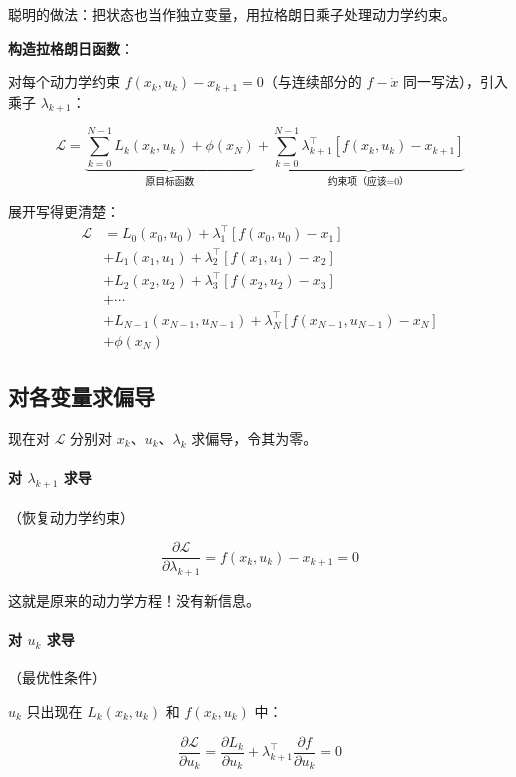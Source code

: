 聪明的做法：把状态也当作独立变量，用拉格朗日乘子处理动力学约束。

\textbf{构造拉格朗日函数}：

对每个动力学约束 $f(x_k, u_k) - x_{k+1} = 0$（与连续部分的 $f - \dot{x}$ 同一写法），引入乘子 $\lambda_{k+1}$：

\begin{equation}
\mathcal{L} = \underbrace{\sum_{k=0}^{N-1} L_k(x_k, u_k) + \phi(x_N)}_{\text{原目标函数}} + \underbrace{\sum_{k=0}^{N-1} \lambda_{k+1}^\top \left[ f(x_k, u_k) - x_{k+1} \right]}_{\text{约束项（应该=0）}}
\end{equation}

展开写得更清楚：
\begin{align}
\mathcal{L} &= L_0(x_0, u_0) + \lambda_1^\top [f(x_0, u_0) - x_1] \\
&+ L_1(x_1, u_1) + \lambda_2^\top [f(x_1, u_1) - x_2] \\
&+ L_2(x_2, u_2) + \lambda_3^\top [f(x_2, u_2) - x_3] \\
&+ \cdots \\
&+ L_{N-1}(x_{N-1}, u_{N-1}) + \lambda_N^\top [f(x_{N-1}, u_{N-1}) - x_N] \\
&+ \phi(x_N)
\end{align}

\subsection{对各变量求偏导}

现在对 $\mathcal{L}$ 分别对 $x_k$、$u_k$、$\lambda_k$ 求偏导，令其为零。

\paragraph{对 $\lambda_{k+1}$ 求导}（恢复动力学约束）

\[
\frac{\partial \mathcal{L}}{\partial \lambda_{k+1}} = f(x_k, u_k) - x_{k+1} = 0
\]

这就是原来的动力学方程！没有新信息。

\paragraph{对 $u_k$ 求导}（最优性条件）

$u_k$ 只出现在 $L_k(x_k, u_k)$ 和 $f(x_k, u_k)$ 中：

\[
\frac{\partial \mathcal{L}}{\partial u_k} = \frac{\partial L_k}{\partial u_k} + \lambda_{k+1}^\top \frac{\partial f}{\partial u_k} = 0
\]


